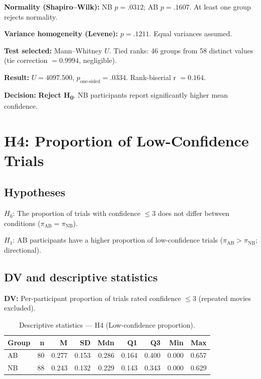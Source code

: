\documentclass[12pt,a4paper]{article}
\begin{document}
\textbf{Normality (Shapiro--Wilk):} NB $p = .0312$; AB $p = .1607$. At least one group rejects normality.

\textbf{Variance homogeneity (Levene):} $p = .1211$. Equal variances assumed.


\textbf{Test selected:} Mann--Whitney $U$. Tied ranks: 46 groups from 58 distinct values (tie correction $= 0.9994$, negligible).

\textbf{Result:} $U = 4097.500$, $p_{\text{one-sided}} = .0334$. Rank-biserial r $= 0.164$.

\textbf{Decision:} \textbf{Reject H\textsubscript{0}}. NB participants report significantly higher mean confidence.


\section{H4: Proportion of Low-Confidence Trials}

\subsection{Hypotheses}

$H_0$: The proportion of trials with confidence $\leq 3$ does not differ between conditions ($\pi_{\text{AB}} = \pi_{\text{NB}}$).

$H_1$: AB participants have a higher proportion of low-confidence trials ($\pi_{\text{AB}} > \pi_{\text{NB}}$; directional).

\subsection{DV and descriptive statistics}

\textbf{DV:} Per-participant proportion of trials rated confidence $\leq 3$ (repeated movies excluded).


\begin{table}[h!]
\centering
\small
\begin{tabular}{lrrrrrrrr}
\hline
\textbf{Group} & \textbf{n} & \textbf{M} & \textbf{SD} & \textbf{Mdn} & \textbf{Q1} & \textbf{Q3} & \textbf{Min} & \textbf{Max} \\
\hline
    AB & 80 & 0.277 & 0.153 & 0.286 & 0.164 & 0.400 & 0.000 & 0.657 \\
    NB & 88 & 0.243 & 0.132 & 0.229 & 0.143 & 0.343 & 0.000 & 0.629 \\
\hline
\end{tabular}
\caption{Descriptive statistics --- H4 (Low-confidence proportion).}
\label{tab:h4_desc}
\end{table}
\end{document}
